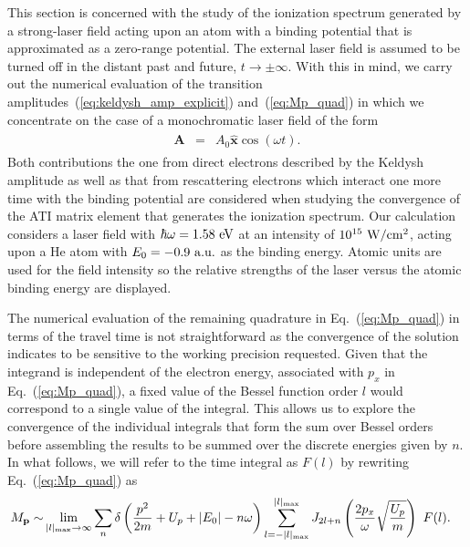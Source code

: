 This section is concerned with the study of the ionization spectrum
generated by a strong-laser field acting upon an atom with a binding
potential that is approximated as a zero-range potential. The external
laser field is assumed to be turned off in the distant past and
future, $t\to\pm\infty$. With this in mind, we carry out the numerical
evaluation of the transition
amplitudes~(\ref{eq:keldysh_amp_explicit}) and~(\ref{eq:Mp_quad}) in
which we concentrate on the case of a monochromatic laser field of the
form
%
\begin{eqnarray}
\label{eq:lp_field}
\begin{split}
\mathbf{A} & = & A_{0}\hat{\mathbf{x}} \cos(\omega t).
\end{split}
\end{eqnarray}
%
Both contributions the one from direct electrons described by the
Keldysh amplitude as well as that from rescattering electrons which
interact one more time with the binding potential are considered when
studying the convergence of the ATI matrix element that generates the
ionization spectrum. Our calculation considers a laser field with
$\hbar\omega = 1.58\ \rm{eV}$ at an intensity of
$10^{15}\ \rm{W}/\rm{cm}^{2}$, acting upon a He atom with $E_{0} =
-0.9\ \rm{a.u.}$ as the binding energy. Atomic units are used for the
field intensity so the relative strengths of the laser versus the
atomic binding energy are displayed.

The numerical evaluation of the remaining quadrature in
Eq.~(\ref{eq:Mp_quad}) in terms of the travel time is not
straightforward as the convergence of the solution indicates to be
sensitive to the working precision requested. Given that the integrand
is independent of the electron energy, associated with $p_{x}$ in
Eq.~(\ref{eq:Mp_quad}), a fixed value of the Bessel function order $l$
would correspond to a single value of the integral. This allows us to
explore the convergence of the individual integrals that form the sum
over Bessel orders before assembling the results to be summed over the
discrete energies given by $n$. In what follows, we will refer to the
time integral as $F(l)$ by rewriting Eq.~(\ref{eq:Mp_quad}) as
%
\begin{eqnarray}
\label{eq:Mp_rew}
\begin{split}
M_{\mathbf{p}} \sim &
  \lim\limits_{|l|_{\rm{max}}\to\infty}
\sum\limits_{n} \delta\left(\frac{p^{2}}{2m} + U_{p} + |E_{0}| - n\omega\right)
\sum\limits_{l=-|l|_{\rm{max}}}\limits^{|l|_{\rm{max}}}
J_{2l+n}\left( \frac{2p_{x}}{\omega} \sqrt{\frac{U_{p}}{m}} \right)\ F(l).
\end{split}
\end{eqnarray}
%

